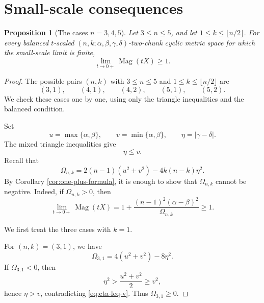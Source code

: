 \documentclass[11pt]{amsart}
\numberwithin{equation}{section}
\newtheorem{proposition}[theorem]{Proposition}
\theoremstyle{definition}
\theoremstyle{remark}
\DeclareMathOperator{\Mag}{Mag}
\begin{document}
\section{Small-scale consequences}

\begin{proposition}[The cases \(n=3,4,5\)]\label{prop:n-3-4-5}
Let \(3\leq n\leq 5\), and let \(1\leq k\leq \lfloor n/2\rfloor\).  For every balanced \(t\)-scaled \((n,k;\alpha,\beta,\gamma,\delta)\)-two-chunk cyclic metric space for which the small-scale limit is finite,
\begin{equation}\label{eq:n-3-4-5-geq-one}
\lim_{t\to 0+}\Mag(tX)\geq 1.
\end{equation}
\end{proposition}

\begin{proof}
The possible pairs \((n,k)\) with \(3\leq n\leq 5\) and
\(1\leq k\leq \lfloor n/2\rfloor\) are
\begin{equation}\label{eq:small-n-all-pairs}
(3,1),\qquad (4,1),\qquad (4,2),\qquad (5,1),\qquad (5,2).
\end{equation}
We check these cases one by one, using only the triangle inequalities and the
balanced condition.

Set
\begin{equation}\label{eq:u-v-eta}
u=\max\{\alpha,\beta\},
\qquad
v=\min\{\alpha,\beta\},
\qquad
\eta=|\gamma-\delta|.
\end{equation}
The mixed triangle inequalities give
\begin{equation}\label{eq:eta-leq-v}
\eta\leq v.
\end{equation}
Recall that
\begin{equation}\label{eq:Omega-small-proof}
\Omega_{n,k}
=
2(n-1)(u^2+v^2)-4k(n-k)\eta^2.
\end{equation}
By Corollary \ref{cor:one-plus-formula}, it is enough to show that
\(\Omega_{n,k}\) cannot be negative.  Indeed, if \(\Omega_{n,k}>0\), then
\[
\lim_{t\to 0+}\Mag(tX)
=
1+\frac{(n-1)^2(\alpha-\beta)^2}{\Omega_{n,k}}
\geq 1.
\]

We first treat the three cases with \(k=1\).

For \((n,k)=(3,1)\), we have
\begin{equation}\label{eq:n3k1-Omega}
\Omega_{3,1}=4(u^2+v^2)-8\eta^2.
\end{equation}
If \(\Omega_{3,1}<0\), then
\begin{equation}\label{eq:n3k1-contradiction}
\eta^2>\frac{u^2+v^2}{2}\geq v^2,
\end{equation}
hence \(\eta>v\), contradicting \eqref{eq:eta-leq-v}.  Thus
\(\Omega_{3,1}\geq 0\).


\end{proof}
\end{document}

